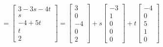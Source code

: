 \documentclass{article}
\begin{document}
\begin{itemize}
\[= \begin{bmatrix} 3 - 3s - 4t \\ s \\ -4 + 5t \\ t \\ 2 \end{bmatrix}
= \begin{bmatrix} 3 \\ 0\\ -4 \\ 0 \\ 2 \end{bmatrix} + s\begin{bmatrix} -3 \\ 1 \\ 0 \\ 0 \\ 0 \end{bmatrix} + t\begin{bmatrix} -4\\ 0 \\ 5 \\ 1 \\ 0 \end{bmatrix}\]
\end{itemize}
\end{document}
